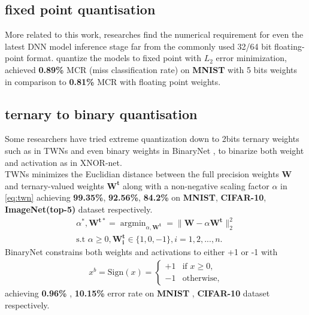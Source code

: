 \subsection{fixed point quantisation}
More related to this work, researches find the numerical requirement for even the latest DNN model inference stage far from the commonly used 32/64 bit floating-point format. \cite{FixedPoint} quantize the models to fixed point with ${L_2}$ error minimization, achieved \textbf{0.89\%} MCR (miss classification rate) on \textbf{MNIST}\cite{mnist} with 5 bits weights in comparison to \textbf{0.81\%} MCR with floating point weights.
\subsection{ternary to binary quantisation}
Some researchers have tried extreme quantization down to 2bits ternary weights such as in TWNs\cite{Ternary} and even binary weights in BinaryNet \cite{BinaryNet}, to binarize both weight and activation as in XNOR-net\cite{XnorNet}. \\
TWNs minimizes the Euclidian distance between the full precision weights $\boldsymbol{W}$ and ternary-valued weights $\boldsymbol{W^t}$ along with a non-negative scaling factor $\alpha$ in \eqref{eq:twn} achieving \textbf{99.35\%}, \textbf{92.56\%}, \textbf{84.2\%} on \textbf{MNIST}, \textbf{CIFAR-10}\cite{cifar10}, \textbf{ImageNet(top-5)} dataset respectively.  
\begin{equation}
\begin{aligned}\label{eq:twn}
    \alpha^*, \boldsymbol{W^{t*}} = \mathop{\arg\min}_{\alpha,\boldsymbol{W^t}} = \|\boldsymbol{W}-\alpha\boldsymbol{W^t}\|^2_2 \\  
\text{s.t }\alpha\geq0,\boldsymbol{W^t_i}\in\{1,0,-1\}, i=1,2,...,n.
\end{aligned}
\end{equation}
BinaryNet constrains both weights and activations to either +1 or -1 with 
\begin{equation}
    \begin{aligned}\label{eq:bn}
        x^b=\text{Sign}(x)=\begin{cases}
                        +1 &\text{if \(x\geq0\)}, \\
                        -1 &\text{otherwise},
                    \end{cases}
    \end{aligned}
\end{equation}
achieving \textbf{0.96\%} , \textbf{10.15\%} error rate on \textbf{MNIST} , \textbf{CIFAR-10} dataset respectively.
